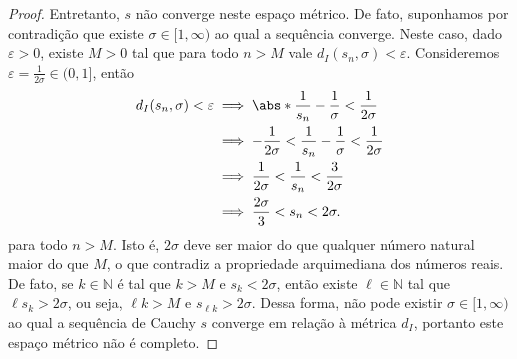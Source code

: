 \begin{proof}
    Entretanto, \(s\) não converge neste espaço métrico. De fato, suponhamos por contradição que existe \(\sigma \in [1,\infty)\) ao qual a sequência converge. Neste caso, dado \(\varepsilon > 0\), existe \(M > 0\) tal que para todo \(n > M\) vale \(d_I(s_n, \sigma) < \varepsilon\).
    Consideremos \(\varepsilon = \frac{1}{2\sigma} \in (0,1]\), então
    \begin{align*}
        d_I(s_n, \sigma) < \varepsilon &\implies \abs*{\frac1{s_n} - \frac1\sigma} < \frac{1}{2\sigma}\\
                                       &\implies -\frac{1}{2\sigma} < \frac1{s_n} - \frac{1}\sigma < \frac1{2\sigma}\\
                                       &\implies \frac{1}{2\sigma} < \frac1{s_n} < \frac{3}{2\sigma}\\
                                       &\implies \frac{2\sigma}{3} < s_n < 2\sigma.
    \end{align*}
    para todo \(n > M\). Isto é, \(2\sigma\) deve ser maior do que qualquer número natural maior do que \(M\), o que contradiz a propriedade arquimediana dos números reais. De fato, se \(k \in \mathbb{N}\) é tal que \(k > M\) e \(s_{k} < 2\sigma\), então existe \(\ell \in \mathbb{N}\) tal que \(\ell s_{k} > 2\sigma\), ou seja, \(\ell k > M\) e \(s_{\ell k} > 2\sigma\). Dessa forma, não pode existir \(\sigma \in [1,\infty)\) ao qual a sequência de Cauchy \(s\) converge em relação à métrica \(d_I\), portanto este espaço métrico não é completo.
\end{proof}

